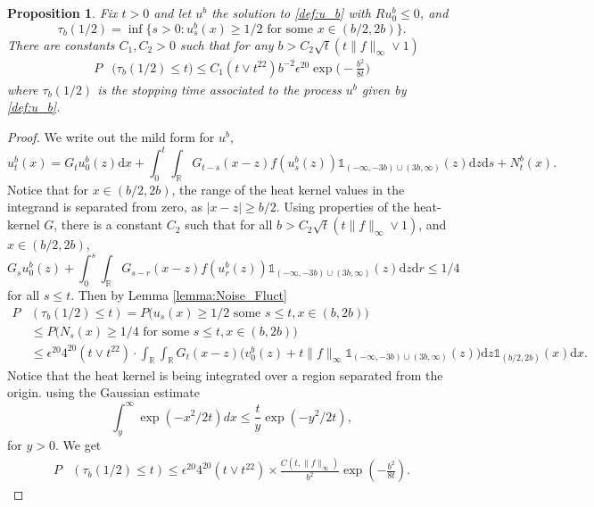\documentclass[12pt,a4paper]{amsart}
\numberwithin{equation}{section}
\theoremstyle{plain}
\newtheorem{proposition}[theorem]{Proposition}
\theoremstyle{remark}
\newcommand{\md}{\mathrm{d}}
\newcommand{\e}{\epsilon}
\newcommand{\R}{\mathbb{R}}
\begin{document}
\begin{proposition}\label{prop:tau_b_cutoff}
Fix $t > 0$ and let $u^b$ the solution to \eqref{def:u_b} with $Ru_0^b \leq 0$, and 
\[
\tau_b(1/2) = \inf\{s > 0 : u^b_s(x) \geq 1/2 \text{ for some $x \in (b/2, 2b)$}\}.
\] There are constants $C_1, C_2 > 0$ such that for any $b > C_2\sqrt{t}(t\|f\|_{\infty} \lor 1)$
\begin{align*}
P&\big(\tau_b(1/2) \leq t\big) \leq C_1(t \lor t^{22})b^{-2}\e^{20}\exp\Big(-\frac{b^2}{8t}\Big)
\end{align*}
where $\tau_b(1/2)$ is the stopping time associated to the process $u^b$ given by \eqref{def:u_b}.
\end{proposition}
\begin{proof}
We write out the mild form for $u^b$,
\[
u_t^b(x) = G_tu_0^b(z)\md x + \int_0^t\int_\R G_{t - s}(x-z)f(u_s^b(z))\mathds{1}_{(-\infty, -3b) \cup (3b, \infty)}(z)\md z \md s + N_t^b(x).
\]
Notice that for $x \in (b/2, 2b)$, the range of the heat kernel values in the integrand is separated from zero, as $|x - z| \geq b/2.$ Using properties of the heat-kernel $G$, there is a constant $C_2$ such that for all
$b > C_2\sqrt{t}(t\|f\|_\infty \lor 1)$, and $x \in (b/2, 2b)$,
\[
G_su_0^b(z) + \int_0^s\int_\R G_{s - r}(x-z)f(u_r^b(z))\mathds{1}_{(-\infty, -3b) \cup (3b, \infty)}(z)\md z \md r \leq 1/4
\]
for all $s \leq t.$
Then by Lemma \ref{lemma:Noise_Fluct}
\begin{align}
P&\left(\tau_b(1/2) \leq t\right) = P\big(u_s(x) \geq 1/2 \text{ some $s \leq t, x \in (b, 2b)$} \big)\\
&\leq P\big(N_s(x) \geq 1/4 \text{ for some $s \leq t, x \in (b, 2b)$} \big)\\
&\leq \e^{20}4^{20}(t \lor t^{22})\cdot \int_\R\int_\R G_t(x - z)\Big(v_0^b(z) + t\|f\|_{\infty}\mathds{1}_{(-\infty, -3b) \cup (3b, \infty)}(z)\Big)\md z \mathds{1}_{(b/2, 2b)}(x)\md x.
\end{align}
Notice that the heat kernel is being integrated over a region separated from the origin. using the Gaussian estimate
\[
\int_y^\infty\exp(-x^2/2t)dx \leq \frac{t}{y}\exp(-y^2/2t),
\]
for $y > 0.$
We get
\begin{align}
P&\left(\tau_b(1/2) \leq t\right) \leq \e^{20}4^{20}(t \lor t^{22}) \times \frac{C(t, \|f\|_\infty)}{b^2}\exp\left(-\frac{b^2}{8t}\right).
\end{align}

\end{proof}
\end{document}
